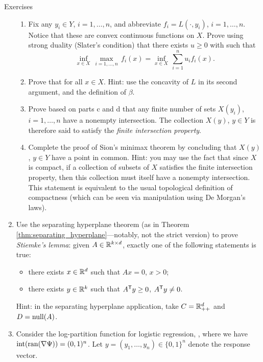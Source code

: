 \begin{xcb}{Exercises}
\begin{enumerate}[label=\thechapter.\arabic*]
\begin{enumerate}[label=\alph*.]
\item Fix any $y_i \in Y$, $i=1,\dots,n$, and abbreviate $f_i = L(\cdot,
  y_i)$, $i=1,\dots,n$. Notice that these are convex continuous functions on 
  $X$. Prove using strong duality (Slater's condition) that there exists $u \geq
  0$ with  such that       
  \[
  \inf_{x \in X} \, \max_{i=1,\dots,n} \, f_i(x) = \inf_{x \in X} \,
  \sum_{i=1}^n u_i f_i(x). 
  \]

\item Prove that  for all $x \in
  X$. Hint: use the concavity of $L$ in its second argument, and the definition
  of $\beta$. 

\item Prove based on parts c and d that any finite number of sets $X(y_i)$, $i =
  1,\dots,n$ have a nonempty intersection. The collection $X(y)$, $y \in Y$ is
  therefore said to satisfy the \emph{finite intersection property}. 

\item Complete the proof of Sion's minimax theorem by concluding that $X(y)$, $y
  \in Y$ have a point in common. Hint: you may use the fact that since $X$ is
  compact, if a collection of subsets of $X$ satisfies the finite intersection
  property, then this collection must itself have a nonempty intersection. This
  statement is equivalent to the usual topological definition of compactness 
  (which can be seen via manipulation using De Morgan's laws).      
\end{enumerate}

\item \label{ex:stiemke_lemma}
  Use the separating hyperplane theorem (as in Theorem
  \ref{thm:separating_hyperplane}---notably, not the strict version) to prove  
  \emph{Stiemke's lemma}: given $A \in \mathbb{R}^{k \times d}$, exactly one of the
  following statements is true:            
  \begin{itemize}
  \item there exists $x \in \mathbb{R}^d$ such that $Ax=0$, $x > 0$;
  \item there exists $y \in \mathbb{R}^k$ such that $A^{\mathsf{T}} y \geq 0$, $A^{\mathsf{T}} y \not=0$. 
  \end{itemize}
  Hint: in the separating hyperplane application, take $C = \mathbb{R}_{++}^d$ and $D = 
  \operatorname{null}(A)$.

\item \label{ex:existence_logistic}
  Consider the log-partition function for logistic regression, 
  , where we have
  $\operatorname{int}(\operatorname{ran}(\nabla \Psi)) = (0,1)^n$. Let $y = (y_1,\dots,y_n) \in
  \{0,1\}^n$ denote the response vector.  


\end{enumerate}
\end{xcb}
